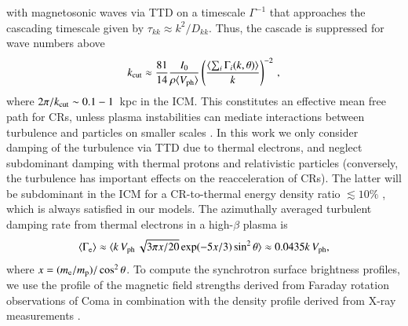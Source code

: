 \documentclass[a4paper,fleqn,usenatbib]{mnras}
\newcommand{\Vph}{V_\mathrm{ph}}
\begin{document}
with magnetosonic waves via TTD on a timescale $\Gamma^{-1}$ that
approaches the cascading timescale given by $\tau_{kk} \approx
k^2/D_{kk}$. Thus, the cascade is suppressed for wave numbers above
\begin{equation}
\label{eq:kc}
  k_\rmn{cut} \approx \frac{81}{14} \frac{I_0}{\rho \langle \Vph \rangle}
  \left(\frac{\langle\sum_i \Gamma_i(k,\theta)\rangle}{k}\right)^{-2}\,,
\end{equation}
where $2\pi/k_{\mathrm{cut}}\sim 0.1-1$~kpc in the ICM. This constitutes an
effective mean free path for CRs, unless plasma instabilities can
mediate interactions between turbulence and particles on smaller
scales \citep{brunetti11}. In this work we only consider damping of
the turbulence via TTD due to thermal electrons, and neglect
subdominant damping with thermal protons and relativistic particles
(conversely, the turbulence has important effects on the
reacceleration of CRs). The latter will be subdominant in the ICM for
a CR-to-thermal energy density ratio $\lesssim 10 \%$
\citep{brunetti07}, which is always satisfied in our models. The
azimuthally averaged turbulent damping rate from thermal electrons
\citep{brunetti07} in a high-$\beta$ plasma is
\begin{equation}
\label{eq:Gamma_e}
\langle\Gamma_{\rmn{e}}\rangle \approx \langle k\,\Vph\,\sqrt{3\pi
  x/20}\exp(-5x/3)\sin^2{\theta}\rangle\approx 0.0435k\,\Vph, 
\end{equation}
where $x=(m_{{\mathrm{e}}}/m_{{\mathrm{p}}})/\cos^2{\theta}$. To compute the
synchrotron surface brightness profiles, we use the profile of the
magnetic field strengths derived from Faraday rotation observations of
Coma \citep{bonafede10} in combination with the density profile
derived from X-ray measurements \citep{1992A&A...259L..31B}.
\end{document}
